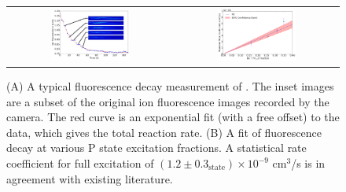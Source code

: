 \begin{figure}[H]
	\centering
	\begin{tabular}{cc}
		\includegraphics[width=0.5\textwidth]{images/Be_H2_decay_images.png} &
		\includegraphics[width=0.5\textwidth]{images/Be_H2_fit.png}
	\end{tabular}
	\caption{(A) A typical fluorescence decay measurement of . The inset images are a subset of the original ion fluorescence images recorded by the camera. The red curve is an exponential fit (with a free offset) to the data, which gives the total reaction rate. (B) A fit of  fluorescence decay at various P state excitation fractions. A statistical rate coefficient for full excitation of $(1.2 \pm 0.3_{\text{state}}) \times 10^{-9}$ cm$^3$/s is in agreement with existing literature.\cite{Roth2006}}
	\label{fig: Be+H2 calibration}
\end{figure}